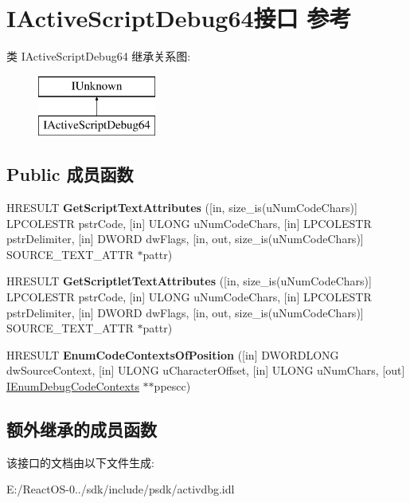 \hypertarget{interface_i_active_script_debug64}{}\section{I\+Active\+Script\+Debug64接口 参考}
\label{interface_i_active_script_debug64}
类 I\+Active\+Script\+Debug64 继承关系图\+:\begin{figure}[H]
\begin{center}
\leavevmode
\includegraphics[height=2.000000cm]{interface_i_active_script_debug64}
\end{center}
\end{figure}
\subsection*{Public 成员函数}
\begin{DoxyCompactItemize}
\item 
\mbox{\label{interface_i_active_script_debug64_a2f73374704660780d1ebde5c018d99aa}} 
H\+R\+E\+S\+U\+LT {\bfseries Get\+Script\+Text\+Attributes} (\mbox{[}in, size\+\_\+is(u\+Num\+Code\+Chars)\mbox{]} L\+P\+C\+O\+L\+E\+S\+TR pstr\+Code, \mbox{[}in\mbox{]} U\+L\+O\+NG u\+Num\+Code\+Chars, \mbox{[}in\mbox{]} L\+P\+C\+O\+L\+E\+S\+TR pstr\+Delimiter, \mbox{[}in\mbox{]} D\+W\+O\+RD dw\+Flags, \mbox{[}in, out, size\+\_\+is(u\+Num\+Code\+Chars)\mbox{]} S\+O\+U\+R\+C\+E\+\_\+\+T\+E\+X\+T\+\_\+\+A\+T\+TR $\ast$pattr)
\item 
\mbox{\label{interface_i_active_script_debug64_af565df2ca7f4cf09435e080e9442d4a3}} 
H\+R\+E\+S\+U\+LT {\bfseries Get\+Scriptlet\+Text\+Attributes} (\mbox{[}in, size\+\_\+is(u\+Num\+Code\+Chars)\mbox{]} L\+P\+C\+O\+L\+E\+S\+TR pstr\+Code, \mbox{[}in\mbox{]} U\+L\+O\+NG u\+Num\+Code\+Chars, \mbox{[}in\mbox{]} L\+P\+C\+O\+L\+E\+S\+TR pstr\+Delimiter, \mbox{[}in\mbox{]} D\+W\+O\+RD dw\+Flags, \mbox{[}in, out, size\+\_\+is(u\+Num\+Code\+Chars)\mbox{]} S\+O\+U\+R\+C\+E\+\_\+\+T\+E\+X\+T\+\_\+\+A\+T\+TR $\ast$pattr)
\item 
\mbox{\label{interface_i_active_script_debug64_a9442ca4ac0c307e9c8a006450e39b25a}} 
H\+R\+E\+S\+U\+LT {\bfseries Enum\+Code\+Contexts\+Of\+Position} (\mbox{[}in\mbox{]} D\+W\+O\+R\+D\+L\+O\+NG dw\+Source\+Context, \mbox{[}in\mbox{]} U\+L\+O\+NG u\+Character\+Offset, \mbox{[}in\mbox{]} U\+L\+O\+NG u\+Num\+Chars, \mbox{[}out\mbox{]} \hyperlink{interface_i_enum_debug_code_contexts}{I\+Enum\+Debug\+Code\+Contexts} $\ast$$\ast$ppescc)
\end{DoxyCompactItemize}
\subsection*{额外继承的成员函数}


该接口的文档由以下文件生成\+:\begin{DoxyCompactItemize}
\item 
E\+:/\+React\+O\+S-\/0../sdk/include/psdk/activdbg.\+idl\end{DoxyCompactItemize}
